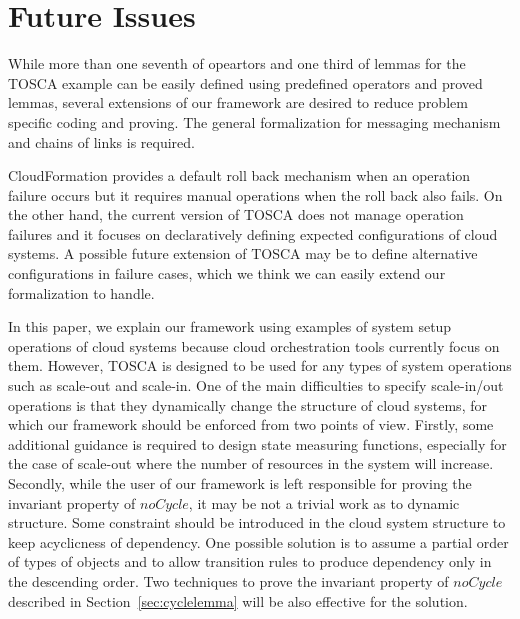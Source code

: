 \documentclass[12pt]{report}
\begin{document}
\section{Future Issues}
While more than one seventh of opeartors and one third of lemmas for
the TOSCA example can be easily defined using predefined operators and
proved lemmas, several extensions of our framework are desired to
reduce problem specific coding and proving. The general formalization
for messaging mechanism and chains of links is required.

CloudFormation provides a default roll back mechanism when an
operation failure occurs but it requires manual operations when the
roll back also fails. On the other hand, the current version of TOSCA
does not manage operation failures and it focuses on declaratively
defining expected configurations of cloud systems. A possible
future extension of TOSCA may be to define alternative configurations
in failure cases, which we think we can easily extend our
formalization to handle.

In this paper, we explain our framework using examples of system setup
operations of cloud systems because cloud orchestration tools
currently focus on them. However, TOSCA is designed to be used for any
types of system operations such as scale-out and scale-in. One of the
main difficulties to specify scale-in/out operations is that they
dynamically change the structure of cloud systems, for which our
framework should be enforced from two points of view. Firstly, some
additional guidance is required to design state measuring functions,
especially for the case of scale-out where the number of resources in
the system will increase. Secondly, while the user of our framework is
left responsible for proving the invariant property of $noCycle$, it
may be not a trivial work as to dynamic structure. Some constraint
should be introduced in the cloud system structure to keep acyclicness
of dependency. One possible solution is to assume a partial order of
types of objects and to allow transition rules to produce dependency
only in the descending order. Two techniques to prove the invariant
property of $noCycle$ described in Section~\ref{sec:cyclelemma} will
be also effective for the solution.

\end{document}
